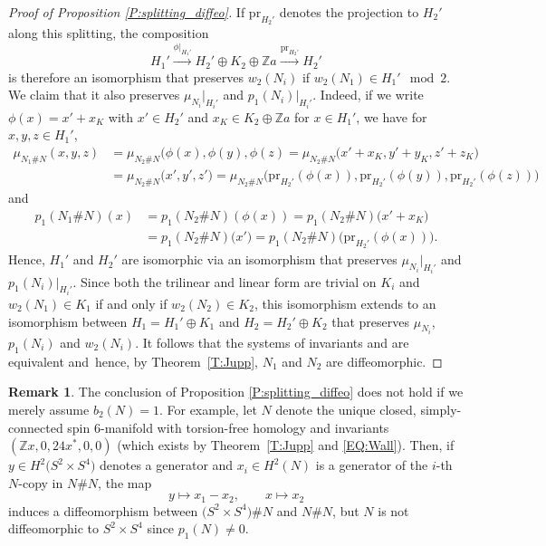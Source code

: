\documentclass[pdftex]{sigma}
\numberwithin{equation}{section}
\theoremstyle{definition}
\newtheorem{Remark}[Theorem]{Remark}
\numberwithin{table}{section}
\newcommand{\Z}{\mathbb{Z}}
\begin{document}
\begin{proof}[Proof of Proposition \ref{P:splitting_diffeo}]
	If $\mathrm{pr}_{H_2'}$ denotes the projection to $H_2'$ along this splitting, the composition
	\[ H_1'\xrightarrow{\phi|_{H_1'}}H_2'\oplus K_2\oplus\Z a\xrightarrow{\mathrm{pr}_{H_2'}}H_2' \]
	is therefore an isomorphism that preserves $w_2(N_i)$ if $w_2(N_1)\in H_1'\mod 2$. We claim that it also preserves $\mu_{N_i}|_{H_i'}$ and $p_1(N_i)|_{H_i'}$. Indeed, if we write $\phi(x)=x'+x_K$ with $x'\in H_2'$ and $x_K\in K_2\oplus\Z a$ for $x\in H_1'$, we have for $x,y,z\in H_1'$,
	\begin{align*}
		\mu_{N_1\# N}(x,y,z)&=\mu_{N_2\# N}(\phi(x),\phi(y),\phi(z)
		=\mu_{N_2\# N}\bigl(x'+x_K,y'+y_K,z'+z_K\bigr)\\
		&=\mu_{N_2\# N}\bigl(x',y',z'\bigr)
		=\mu_{N_2\# N}\bigl(\mathrm{pr}_{H_2'}(\phi(x)),\mathrm{pr}_{H_2'}(\phi(y)),\mathrm{pr}_{H_2'}(\phi(z))\bigr)
	\end{align*}
	and
	\begin{align*}
		p_1(N_1\# N)(x)&=p_1(N_2\# N)(\phi(x))
        =p_1(N_2\# N)\bigl(x'+x_K\bigr)\\
        &=p_1(N_2\# N)\bigl(x'\bigr)
        =p_1(N_2\# N)\bigl(\mathrm{pr}_{H_2'}(\phi(x))\bigr).
	\end{align*}
Hence, $H_1'$ and $H_2'$ are isomorphic via an isomorphism that preserves $\mu_{N_i}|_{H_i'}$ and $p_1(N_i)|_{H_i'}$. Since both the trilinear and linear form are trivial on $K_i$ and $w_2(N_1)\in K_1$ if and only if $w_2(N_2)\in K_2$, this isomorphism extends to an isomorphism between $H_1=H_1'\oplus K_1$ and ${H_2=H_2'\oplus K_2}$ that preserves $\mu_{N_i}$, $p_1(N_i)$ and $w_2(N_i)$. It follows that the systems of invariants  and  are equivalent and~hence, by Theorem~\ref{T:Jupp}, $N_1$ and $N_2$ are diffeomorphic.
\end{proof}

\begin{Remark}
	The conclusion of Proposition \ref{P:splitting_diffeo} does not hold if we merely assume $b_2(N)=1$. For example, let $N$ denote the unique closed, simply-connected spin $6$-manifold with torsion-free homology and invariants $(\Z x,0,24x^*,0,0)$ (which exists by Theorem~\ref{T:Jupp} and \eqref{EQ:Wall}). Then, if $y\in H^2\bigl(S^2\times S^4\bigr)$ denotes a generator and $x_i\in H^2(N)$ is a generator of the $i$-th $N$-copy in $N\# N$, the map
	\[ y\mapsto x_1-x_2,\qquad x\mapsto x_2 \]
	induces a diffeomorphism between $\bigl(S^2\times S^4\bigr)\# N$ and $N\#N$, but $N$ is not diffeomorphic to $S^2\times S^4$ since $p_1(N)\neq 0$.
\end{Remark}
\end{document}
